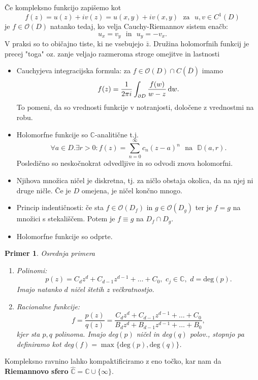 \documentclass{article}
\newtheorem{primer}{Primer}
\newcommand{\C}{\mathbb{C}}
\newcommand{\D}{\mathbb{D}}
\newcommand{\Ho}{\mathcal{O}}
\begin{document}
Če kompleksno funkcijo zapišemo kot 
$$
f(z) = u(z) + iv(z) = u(x, y) + iv(x, y) \,\, \text{ za } \,\, u, v\in C^1(D)
$$
je $f\in \Ho(D)$ natanko tedaj, ko velja Cauchy-Riemannov sistem 
enačb:
\begin{equation}
u_x = v_y \,\,\text{ in }\,\, u_y = -v_x.
\end{equation}
V praksi so to običajno tiste, ki ne vsebujejo $\bar{z}$.
\noindent
Družina holomorfnih funkcij je precej "toga" oz. 
zanje veljajo razmeroma stroge omejitve in lastnosti 
\begin{itemize}
    \item Cauchyjeva integracijska formula: za $f\in \Ho(D) \cap C(\overline{D})$
    imamo 
    \begin{equation}
    f(z) = \frac{1}{2\pi i} \int_{\partial D} \frac{f(w)}{w - z} \dif w.
    \end{equation}
    To pomeni, da so vrednosti funkcije v notranjosti, določene z vrednostmi na robu.
    \item Holomorfne funkcije so $\C$-analitične t.j. 
    $$
    \forall a\in D. \exists r > 0: f(z) = \sum_{n=0}^\infty c_n(z- a)^n \,\, \text{ na }\,\, \D(a, r).
    $$
    Posledično so neskočnokrat odvedljive in so odvodi znova holomorfni.
    \item Njihova množica ničel je diskretna, tj. za ničlo 
    obstaja okolica, da na njej ni druge ničle. Če je $D$ omejena, 
    je ničel končno mnogo.
    \item Princip indentičnosti: če sta $f\in \Ho(D_f)$ in $g\in \Ho(D_g)$
    ter je $f = g$ na množici s stekališčem. Potem je 
    $f \equiv g $ na $D_f \cap D_g$. 
    \item Holomorfne funkcije so odprte. 
\end{itemize}

\begin{primer}
Osrednja primera 
\hfill 
\begin{enumerate}
    \item[i)] Polinomi: 
    $$
    p(z) = C_d z^d + C_{d-1} z^{d-1} + \dots + C_0, \,\, c_j \in \C, \,\, d = \text{deg}(p). 
    $$
    Imajo natanko $d$ ničel štetih z večkratnostjo. 
    \item[ii)] Racionalne funkcije: 
    $$
    f = \frac{p(z)}{q(z)} = \frac{C_d z^d + C_{d-1} z^{d-1} + \dots + C_0}{B_d z^d + B_{d-1} z^{d-1} + \dots + B_0},
    $$
    kjer sta $p, q$ polinoma. Imajo deg$(p)$ ničel in deg$(q)$ polov., stopnjo 
    pa definiramo kot deg$(f) = \max\{\text{deg}(p), \text{deg}(q)\}$.
\end{enumerate}
\end{primer}
\noindent
Kompleksno ravnino lahko kompaktificiramo z eno točko, kar nam da \textbf{Riemannovo sfero} $\hat{\C} = \C \cup \{\infty\}$.\\
\end{document}
